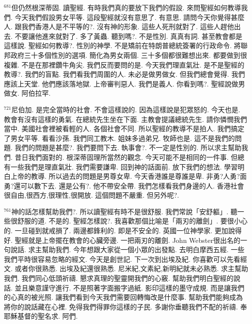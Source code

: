 \documentclass{book}
\begin{document}
$^{681}$但仍然根深蒂固.
讀聖經.
有時我們真的要放下我們的假設.
來問聖經如何教導我們.
今天我們假設男女平等.
這段聖經就沒有意思了.
有意思.
請問今天你覺得甚麼人.
跟我們香港人是不平等的?.
沒有神的形象.
這些人死刑就對了.
這些人趕他出去.
不要讓他進來就對了.
多了黃蟲.
聽到嗎?.
不是性別.
真真有詞.
甚至教會都是這樣說.
聖經如何教導?.
性別的神學.
不是矯前在特朗普總統簽署的行政命令.
將聯邦政府三十多個性別的選項.
簡化為男女兩個.
三十多個都很難想出來.
都要做到很複雜.
不是在那裡鑽牛角尖.
我們反而要問的是.
今天我們理直氣壯.
是不是聖經的教導?.
我們的盲點.
我們看我們周圍的人.
未必是做男做女.
但我們總會覺得.
我們應該上天堂.
他們應該落地獄.
上帝審判惡人.
我們是義人.
你看到嗎?.
聖經說做男做女.
阿伯拉罕.

$^{721}$尼伯加.
是完全當時的社會.
不會這樣說的.
因為這樣說是犯眾怒的.
今天也是.
教會有沒有這樣的勇氣.
在總統先生坐在下面.
主教會提議總統先生.
請你憐憫我們當中.
美國社會裡被看輕的人.
各個社會不同.
所以聖經的教導不是拍人.
我們搞定了男女平等.
看看沙孫.
我們同工教木.
姐妹多過弟兄.
牧師也是.
這不是我們的問題.
我們的問題是甚麼?.
我們要問下去.
執事會?.
不一定是性別的.
所以求主幫助我們.
昔日我們面對的.
根深蒂固理所當然的觀念.
今天可能不是相同的一件事.
但總有一些我們是理直氣壯.
我們需要謙卑.
回到神的話面前.
放下我們的想法.
學習明白上帝的教導.
所以過去的問題是男尊女卑.
今天香港誰是尊誰是卑.
非勇?人勇?面勇?還可以數下去.
還是公有?.
他不帶安全帶.
我們怎樣看我們身邊的人.
香港社會很自由,很西方,很理性,很開放.
這個問題不嚴重.
但另外呢?.

$^{761}$神的話怎樣幫助我們?.
所以讀聖經有時不是很舒服.
我們常說「安舒軀」.
聽一些很舒服的道.
不是的.
聖經怎樣說?.
我喜歡那個比喻是「兩刃的離劍」.
要很小心的.
一旦碰到就戒損了.
兩邊都鋒利的.
即是不安全的.
英國一位神學家.
更加說得好.
聖經就是上帝擺在教會的心臟旁邊.
一把兩刃的離劍.
John Webster很出名的一句說話.
求主幫助我們.
今年想跟大家從一個小眾的出發點.
去明白摩西五經.
一些我們平時很容易忽略的經文.
今天是創世記.
下一次到出埃及紀.
你喜歡可以先看經文.
或者你很熟悉.
出埃及紀還很熟悉.
尼米紀,文素紀,新明紀就未必熟悉.
求主幫助我們.
我們同心低頭祈禱.
懇求真理的聖靈開我們的心竅.
幫助我們明白聖經的說話.
並且樂意謹守進行.
不是照著字面搬字過紙.
影印這樣的墨守成規.
而是讓我們的心真的被光照.
讓我們看到今天我們需要回轉悔改是什麼事.
幫助我們能夠成為將你的說話藏在心裡.
免得我們得罪你這樣的子民.
多謝你垂聽我們不配的祈禱.
奉耶穌基督的聖名求.
阿們.

\newpage
\end{document}
